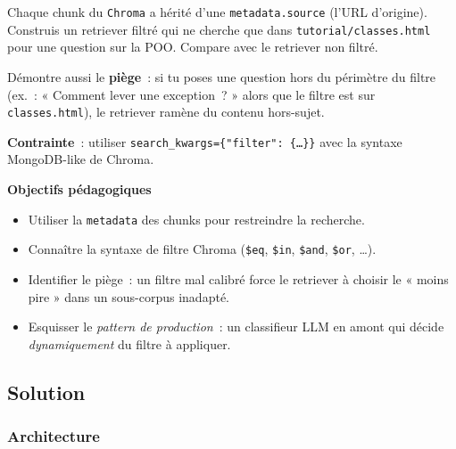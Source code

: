 \documentclass[11pt,a4paper]{article}
\begin{document}
\begin{tcolorbox}[title=Exercice bonus 6. Restreindre la recherche à une sous-partie du corpus]
Chaque chunk du \texttt{Chroma} a hérité d'une \texttt{metadata.source}
(l'URL d'origine). Construis un retriever filtré qui ne cherche que dans
\texttt{tutorial/classes.html} pour une question sur la POO. Compare
avec le retriever non filtré.

Démontre aussi le \textbf{piège}~: si tu poses une question hors du
périmètre du filtre (ex.~: « Comment lever une exception~? » alors que
le filtre est sur \texttt{classes.html}), le retriever ramène du contenu
hors-sujet.

\textbf{Contrainte}~: utiliser \texttt{search\_kwargs=\{"filter": \{\dots\}\}}
avec la syntaxe MongoDB-like de Chroma.

\bigskip
\noindent\textbf{Objectifs pédagogiques}
\begin{itemize}[leftmargin=*]
  \item Utiliser la \texttt{metadata} des chunks pour restreindre la
        recherche.
  \item Connaître la syntaxe de filtre Chroma (\texttt{\$eq},
        \texttt{\$in}, \texttt{\$and}, \texttt{\$or}, \dots).
  \item Identifier le piège~: un filtre mal calibré force le retriever
        à choisir le « moins pire » dans un sous-corpus inadapté.
  \item Esquisser le \emph{pattern de production}~: un classifieur LLM
        en amont qui décide \emph{dynamiquement} du filtre à appliquer.
\end{itemize}
\end{tcolorbox}

\subsection{Solution}

\subsubsection{Architecture}

\begin{center}
\end{center}
\end{document}
